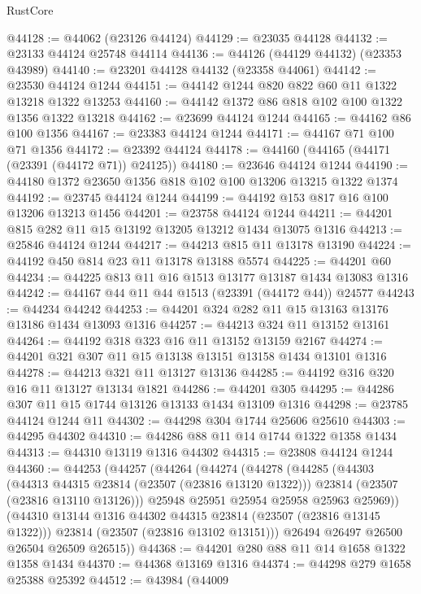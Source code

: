 \begin{lexlean}{RustCore}
\begin{coremodule}
@44128 := @44062 (@23126 @44124)
@44129 := @23035 @44128
@44132 := @23133 @44124 @25748 @44114
@44136 := @44126 (@44129 @44132) (@23353 @43989)
@44140 := @23201 @44128 @44132 (@23358 @44061)
@44142 := @23530 @44124 @1244
@44151 := @44142 @1244 @820 @822 @60 @11 @1322 @13218 @1322 @13253
@44160 := @44142 @1372 @86 @818 @102 @100 @1322 @1356 @1322 @13218
@44162 := @23699 @44124 @1244
@44165 := @44162 @86 @100 @1356
@44167 := @23383 @44124 @1244
@44171 := @44167 @71 @100 @71 @1356
@44172 := @23392 @44124
@44178 := @44160 (@44165 (@44171 (@23391 (@44172 @71)) @24125))
@44180 := @23646 @44124 @1244
@44190 := @44180 @1372 @23650 @1356 @818 @102 @100 @13206 @13215 @1322 @1374
@44192 := @23745 @44124 @1244
@44199 := @44192 @153 @817 @16 @100 @13206 @13213 @1456
@44201 := @23758 @44124 @1244
@44211 := @44201 @815 @282 @11 @15 @13192 @13205 @13212 @1434 @13075 @1316
@44213 := @25846 @44124 @1244
@44217 := @44213 @815 @11 @13178 @13190
@44224 := @44192 @450 @814 @23 @11 @13178 @13188 @5574
@44225 := @44201 @60
@44234 := @44225 @813 @11 @16 @1513 @13177 @13187 @1434 @13083 @1316
@44242 := @44167 @44 @11 @44 @1513 (@23391 (@44172 @44)) @24577
@44243 := @44234 @44242
@44253 := @44201 @324 @282 @11 @15 @13163 @13176 @13186 @1434 @13093 @1316
@44257 := @44213 @324 @11 @13152 @13161
@44264 := @44192 @318 @323 @16 @11 @13152 @13159 @2167
@44274 := @44201 @321 @307 @11 @15 @13138 @13151 @13158 @1434 @13101 @1316
@44278 := @44213 @321 @11 @13127 @13136
@44285 := @44192 @316 @320 @16 @11 @13127 @13134 @1821
@44286 := @44201 @305
@44295 := @44286 @307 @11 @15 @1744 @13126 @13133 @1434 @13109 @1316
@44298 := @23785 @44124 @1244 @11
@44302 := @44298 @304 @1744 @25606 @25610
@44303 := @44295 @44302
@44310 := @44286 @88 @11 @14 @1744 @1322 @1358 @1434
@44313 := @44310 @13119 @1316 @44302
@44315 := @23808 @44124 @1244
@44360 := @44253
    (@44257
      (@44264
        (@44274
          (@44278
            (@44285
              (@44303
                (@44313 @44315 @23814 (@23507 (@23816 @13120 @1322)))
                @23814
                (@23507 (@23816 @13110 @13126)))
              @25948
              @25951
              @25954
              @25958
              @25963
              @25969))
          (@44310 @13144 @1316 @44302 @44315 @23814 (@23507 (@23816 @13145 @1322)))
          @23814
          (@23507 (@23816 @13102 @13151)))
        @26494
        @26497
        @26500
        @26504
        @26509
        @26515))
@44368 := @44201 @280 @88 @11 @14 @1658 @1322 @1358 @1434
@44370 := @44368 @13169 @1316
@44374 := @44298 @279 @1658 @25388 @25392
@44512 := @43984
    (@44009

\end{coremodule}
\end{lexlean}
